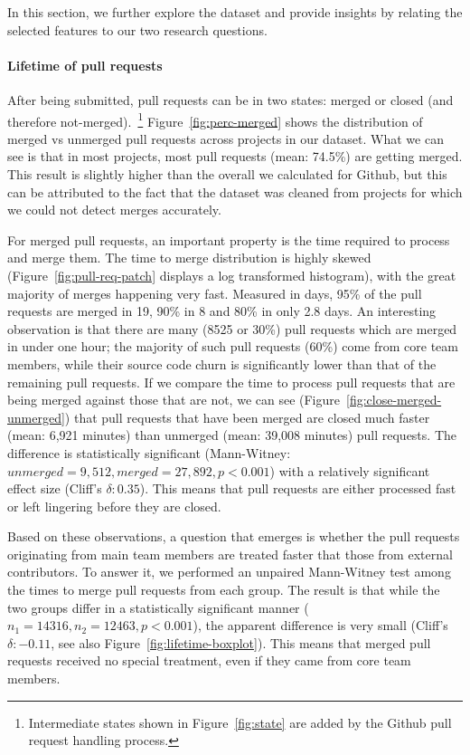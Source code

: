 \documentclass{sig-alternate}
\begin{document}
In this section, we further explore the dataset and provide insights
by relating the selected features to our two research questions.

\paragraph*{Lifetime of pull requests}

After being submitted, pull requests can be in two states: merged or closed
(and therefore not-merged).~\footnote{Intermediate states shown in
Figure~\ref{fig:state} are added by the Github pull request handling process.} 
Figure~\ref{fig:perc-merged} shows the distribution of merged vs unmerged
pull requests across projects in our dataset. What we can see is that
in most projects, most pull requests (mean: 74.5\%) are getting
merged. This result is slightly higher than the overall we calculated for
Github, but this can be attributed to the fact that the dataset was cleaned
from projects for which we could not detect merges accurately. 

For merged pull requests, an important property is the time required to process
and merge them. The time to merge distribution is highly skewed
(Figure~\ref{fig:pull-req-patch} displays a log transformed histogram), with the
great majority of merges happening very fast. Measured in days, 95\% of the pull
requests are merged in 19, 90\% in 8 and 80\% in only 2.8 days. An interesting
observation is that there are many (8525 or 30\%) pull requests which are merged
in under one hour; the majority of such pull requests (60\%) come from core team
members, while their source code churn is significantly lower than that of the
remaining pull requests. If we compare the time to process pull requests that
are being merged against those that are not, we can see
(Figure~\ref{fig:close-merged-unmerged}) that pull requests that have been
merged are closed much faster (mean: 6,921 minutes) than unmerged (mean: 39,008 minutes) pull requests. The difference is
statistically significant (Mann-Witney: $unmerged = 9,512, merged = 27,892, p < 0.001$) with a relatively
significant effect size (Cliff's $\delta: 0.35$).
This means that pull requests are either processed fast or left lingering 
before they are closed.

Based on these observations, a question that emerges is
whether the pull requests originating from main team members are treated faster
that those from external contributors. To answer it, we performed an unpaired
Mann-Witney test among the times to merge pull requests from each group. The
result is that while the two groups differ in a statistically significant manner
($n_1 = 14316, n_2 = 12463, p < 0.001$), the apparent difference is very small
(Cliff's $\delta: -0.11$, see also Figure~\ref{fig:lifetime-boxplot}). This
means that merged pull requests received no special treatment, even if they came
from core team members.
\end{document}
